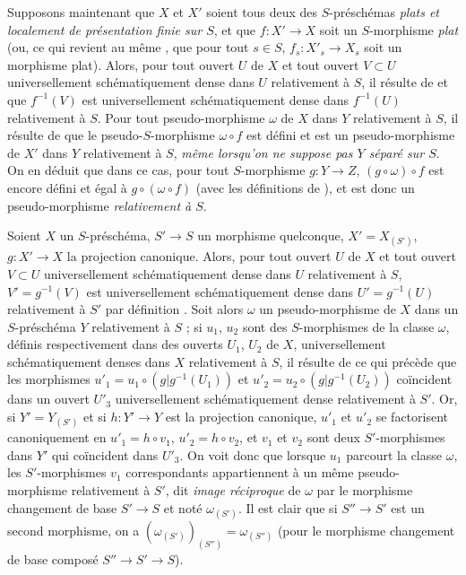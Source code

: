 \begin{env}[20.5.7]
\label{IV.20.5.7}
Supposons maintenant que $X$ et $X'$ soient tous deux des $S$-préschémas \emph{plats et localement de présentation finie sur $S$}, et que $f:X'\to X$ soit un $S$-morphisme \emph{plat} (ou, ce qui revient au même , que pour tout $s\in S$, $f_s:X'_s\to X_s$ soit un morphisme plat).
Alors, pour tout ouvert $U$ de $X$ et tout ouvert $V\subset U$ universellement schématiquement dense dans $U$ relativement à $S$, il résulte de  et  que $f^{-1}(V)$ est universellement schématiquement dense dans $f^{-1}(U)$ relativement à $S$.
Pour tout pseudo-morphisme $\omega$ de $X$ dans $Y$ relativement à $S$, il résulte de  que le pseudo-$S$-morphisme $\omega\circ f$ est défini et est un pseudo-morphisme de $X'$ dans $Y$ relativement à $S$, \emph{même lorsqu'on ne suppose pas $Y$ séparé sur $S$}.
On en déduit que dans ce cas, pour tout $S$-morphisme $g:Y\to Z$, $(g\circ\omega)\circ f$ est encore défini et égal à $g\circ(\omega\circ f)$ (avec les définitions de ), et est donc un pseudo-morphisme \emph{relativement à $S$}.
\end{env}

\begin{env}[20.5.8]
\label{IV.20.5.8}
Soient $X$ un $S$-préschéma, $S'\to S$ un morphisme quelconque, $X'=X_{(S')}$, $g:X'\to X$ la projection canonique.
Alors, pour tout ouvert $U$ de $X$ et tout ouvert $V\subset U$ universellement schématiquement dense dans $U$ relativement à $S$, $V'=g^{-1}(V)$ est universellement schématiquement dense dans $U'=g^{-1}(U)$ relativement à $S'$ par définition .
Soit alors $\omega$ un pseudo-morphisme de $X$ dans un $S$-préschéma $Y$ relativement à $S$ ; si $u_1$, $u_2$ sont des $S$-morphismes de la classe $\omega$, définis respectivement dans des ouverts $U_1$, $U_2$ de $X$, universellement schématiquement denses dans $X$ relativement à $S$, il résulte de ce qui précède que les morphismes $u'_1=u_1\circ(g|g^{-1}(U_1))$ et $u'_2=u_2\circ(g|g^{-1}(U_2))$ coïncident dans un ouvert $U'_3$ universellement schématiquement dense relativement à $S'$.
Or, si $Y'=Y_{(S')}$ et si $h:Y'\to Y$ est la projection canonique, $u'_1$ et $u'_2$ se factorisent canoniquement en $u'_1=h\circ v_1$, $u'_2=h\circ v_2$, et $v_1$ et $v_2$ sont deux $S'$-morphismes dans $Y'$ qui coïncident dans $U'_3$.
On voit donc que lorsque $u_1$ parcourt la classe $\omega$, les $S'$-morphismes $v_1$ correspondants appartiennent à un même pseudo-morphisme relativement à $S'$, dit \emph{image réciproque} de $\omega$ par le morphisme changement de base $S'\to S$ et noté $\omega_{(S')}$.
Il est clair que si $S''\to S'$ est un second morphisme, on a $(\omega_{(S')})_{(S'')}=\omega_{(S'')}$ (pour le morphisme changement de base composé $S''\to S'\to S$).
\end{env}

